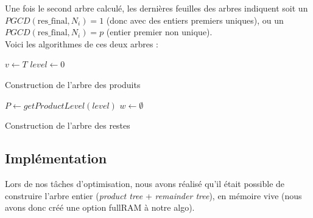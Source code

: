 Une fois le second arbre calculé, les dernières feuilles des arbres indiquent soit un $PGCD(\text{res\_final}, N_i ) = 1$ (donc avec des entiers premiers uniques), ou un $PGCD(\text{res\_final}, N_i ) = p$ (entier premier non unique).\\


Voici les algorithmes de ces deux arbres :\\


\begin{algorithm}[H]
\label{alg:productTree}
 $v \leftarrow T$\;
 $level \leftarrow 0$\;
 \caption{Construction de l'arbre des produits} 
\end{algorithm}
\vspace{0.7cm}



\begin{algorithm}[H]
 \label{alg:remainderTree}
 $P \leftarrow getProductLevel(level)$\;
 $w \leftarrow \emptyset$\;
 \caption{Construction de l'arbre des restes}
\end{algorithm}
\vspace{0.7cm}


\subsection{Implémentation}


Lors de nos tâches d'optimisation, nous avons réalisé qu'il était possible de construire l'arbre entier (\textit{product tree} + \textit{remainder tree}), en mémoire vive (nous avons donc créé une option fullRAM à notre algo).\\


